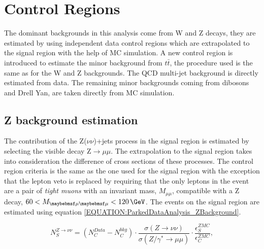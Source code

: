 \section{Control Regions}
\label{SECTION:ParkedDataAnalysis_ControlRegions}


The dominant backgrounds in this analysis come from W and Z decays, they are estimated by using independent data control regions which are extrapolated to the signal region with the help of \gls{MC} simulation. A new control region is introduced to estimate the minor background from $t\bar{t}$, the procedure used is the same as for the W and Z backgrounds. The \gls{QCD} multi-jet background is directly estimated from data. The remaining minor backgrounds coming from dibosons and Drell Yan, are taken directly from \gls{MC} simulation.

\subsection{Z background estimation}
\label{SECTION:ParkedDataAnalysis_ControlRegions_ZBackground}


The contribution of the Z($\nu\nu$)+jets process in the signal region is estimated by selecting the visible decay Z$\rightarrow\mu\mu$. The extrapolation to the signal region takes into consideration the difference of cross sections of these processes. The control region criteria is the same as the one used for the signal region with the exception that the lepton veto is replaced by requiring that the only leptons in the event are a pair of \textit{tight muons} with an invariant mass, $M_{\mu\mu}$, compatible with a Z decay, $60<M_{\mu\mu}<120\,\GeV$. The events on the signal region are estimated using equation \ref{EQUATION:ParkedDataAnalysis_ZBackground}.

\begin{equation}
N_{S}^{Z\rightarrow\nu\nu}=\left(N_{C}^{Data}-N_{C}^{bkg}\right) \cdot\frac{\sigma\left(Z\rightarrow\nu\nu\right)}{\sigma\left(Z/\gamma^{*}\rightarrow\mu\mu\right)}\cdot \frac{\epsilon_{S}^{ZMC}}{\epsilon_{C}^{ZMC}},
\label{EQUATION:ParkedDataAnalysis_ZBackground}
\end{equation}

